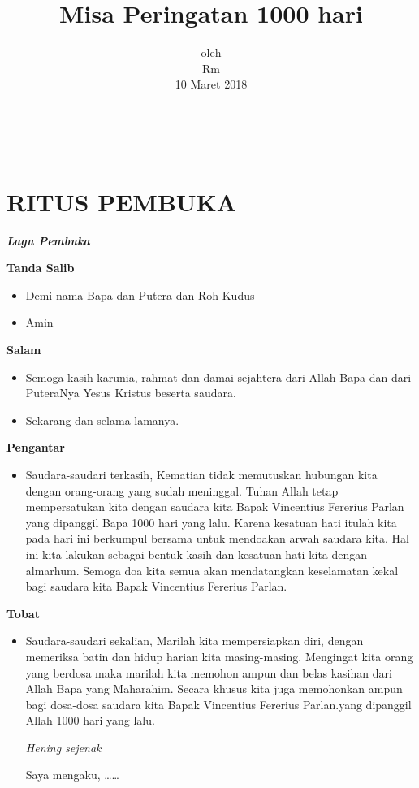 \documentclass[titlepage,10pt,openany]{scrbook}
\title{Misa Peringatan 1000 hari}
\author{\namaalm}
\date{oleh \\ Rm \namaromo\\10 Maret 2018}
\makeatletter
\newcommand{\subjudul}[1]{%
  {\parindent \z@ 
    \interlinepenalty\@M \bfseries #1\par\nobreak \vskip 10\p@ }}
\newcommand{\lagu}[1]{%
  {\parindent \z@ 
    \interlinepenalty\@M \slshape \bfseries \normalsize \textit{#1}\par\nobreak \vskip 10\p@ }}
\newcommand{\BU}[1]{\begin{itemize} \item[U:] #1 \end{itemize}}
\newcommand{\BI}[1]{\begin{itemize} \item[I:] #1 \end{itemize}}
\newcommand{\namaalm}{Bapak Vincentius Fererius Parlan\xspace}
\newcommand{\namaromo}{Basilius Edy Wiyanto Pr.\xspace}
\makeatother
\begin{document}
\thispagestyle{empty}



\newpage
{~}
\thispagestyle{empty}
\newpage

\section*{RITUS PEMBUKA} 

 

\lagu{Lagu Pembuka}  
 

\subjudul{Tanda Salib} 

\BI{Demi nama  Bapa dan Putera dan Roh Kudus}

\BU{Amin}

 

\subjudul{Salam}

\BI{Semoga kasih karunia, rahmat dan damai sejahtera dari 
Allah Bapa dan dari PuteraNya Yesus Kristus beserta 
saudara.} 

\BU{Sekarang dan selama-lamanya.}

 

\subjudul{Pengantar}

\BI{Saudara-saudari terkasih, 
	Kematian tidak memutuskan hubungan kita dengan 
	orang-orang yang sudah meninggal. Tuhan Allah tetap 
	mempersatukan kita dengan saudara kita \namaalm yang 
	dipanggil Bapa 1000 hari yang lalu. Karena kesatuan hati 
	itulah kita pada hari ini berkumpul bersama untuk 
	mendoakan arwah saudara kita. Hal ini kita lakukan 
	sebagai bentuk kasih dan kesatuan hati kita dengan 
	almarhum. Semoga doa kita semua akan mendatangkan 
	keselamatan kekal bagi saudara kita \namaalm.}


\subjudul{Tobat}

\BI{Saudara-saudari sekalian, 
	Marilah kita mempersiapkan diri, dengan memeriksa 
	batin dan hidup harian kita masing-masing. Mengingat 
	kita orang yang berdosa maka marilah kita memohon ampun dan belas kasihan dari Allah Bapa yang 
	Maharahim. Secara khusus kita juga memohonkan ampun 
	bagi dosa-dosa saudara kita \namaalm.yang dipanggil Allah 
	1000 hari yang lalu. 
	
	\textit{Hening sejenak }
	
	

Saya mengaku, \ldots \ldots
} 
\end{document}
